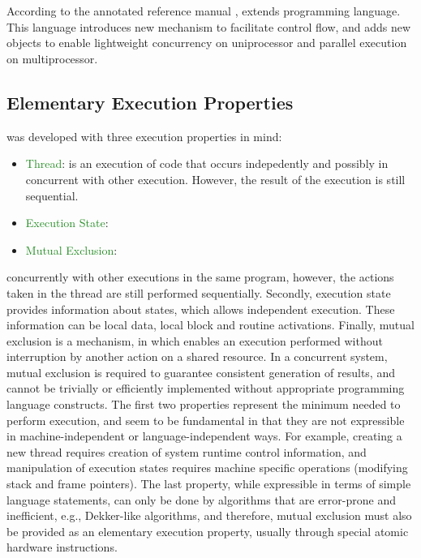 \chapter{\uCPP} \label{uCPP}

According to the \uCPPS annotated reference manual \cite{reference10}, \uCPPS
extends \CCS programming language. This language introduces new mechanism to
facilitate control flow, and adds new objects to enable lightweight concurrency
on uniprocessor and parallel execution on multiprocessor.

\section{Elementary Execution Properties}
\uCPPS was developed with three execution properties in mind:
\begin{itemize}
\item \textcolor{ForestGreen}{Thread}: is an execution of code that occurs
indepedently and possibly in concurrent with other execution. However, the
result of the execution is still sequential.
\item \textcolor{ForestGreen}{Execution State}:
\item \textcolor{ForestGreen}{Mutual Exclusion}:
\end{itemize}
concurrently with other executions in the same program, however, the actions
taken in the thread are still performed sequentially. Secondly, execution state
provides information about states, which allows independent execution. These
information can be local data, local block and routine activations. Finally,
mutual exclusion is a mechanism, in which enables an execution performed without
interruption by another action on a shared resource. In a concurrent system, mutual exclusion is required to guarantee consistent
generation
of results, and cannot be trivially or efficiently implemented without
appropriate programming language
constructs.
The first two properties represent the minimum needed to perform execution, and
seem to be fundamental in that
they are not expressible in machine-independent or language-independent ways.
For example, creating a new thread
requires creation of system runtime control information, and manipulation of
execution states requires machine specific
operations (modifying stack and frame pointers). The last property, while
expressible in terms of simple language
statements, can only be done by algorithms that are error-prone and inefficient,
e.g., Dekker-like algorithms, and
therefore, mutual exclusion must also be provided as an elementary execution
property, usually through special atomic
hardware instructions.

